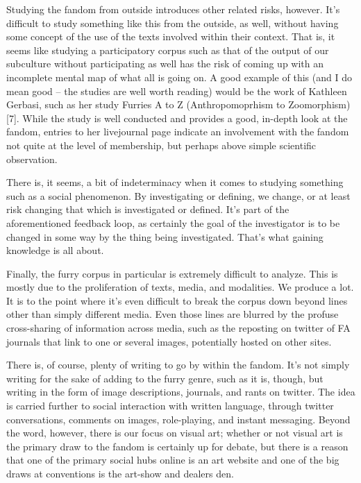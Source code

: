 Studying the fandom from outside introduces other related risks, however. It's difficult to study something like this from the outside, as well, without having some concept of the use of the texts involved within their context. That is, it seems like studying a participatory corpus such as that of the output of our subculture without participating as well has the risk of coming up with an incomplete mental map of what all is going on. A good example of this (and I do mean good -- the studies are well worth reading) would be the work of Kathleen Gerbasi, such as her study Furries A to Z (Anthropomoprhism to Zoomorphism)[7]. While the study is well conducted and provides a good, in-depth look at the fandom, entries to her livejournal page indicate an involvement with the fandom not quite at the level of membership, but perhaps above simple scientific observation.

There is, it seems, a bit of indeterminacy when it comes to studying something such as a social phenomenon. By investigating or defining, we change, or at least risk changing that which is investigated or defined. It's part of the aforementioned feedback loop, as certainly the goal of the investigator is to be changed in some way by the thing being investigated. That's what gaining knowledge is all about.

Finally, the furry corpus in particular is extremely difficult to analyze. This is mostly due to the proliferation of texts, media, and modalities. We produce a lot. It is to the point where it's even difficult to break the corpus down beyond lines other than simply different media. Even those lines are blurred by the profuse cross-sharing of information across media, such as the reposting on twitter of FA journals that link to one or several images, potentially hosted on other sites.

There is, of course, plenty of writing to go by within the fandom. It's not simply writing for the sake of adding to the furry genre, such as it is, though, but writing in the form of image descriptions, journals, and rants on twitter. The idea is carried further to social interaction with written language, through twitter conversations, comments on images, role-playing, and instant messaging. Beyond the word, however, there is our focus on visual art; whether or not visual art is the primary draw to the fandom is certainly up for debate, but there is a reason that one of the primary social hubs online is an art website and one of the big draws at conventions is the art-show and dealers den.

